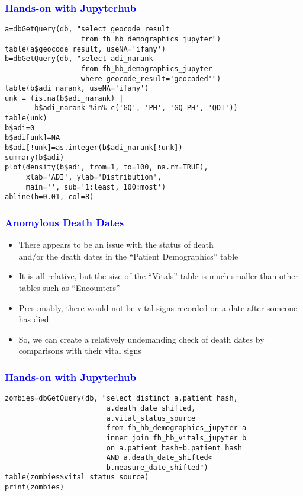 \documentclass[11pt,pdftex,dvipsnames,usenames]{beamer}
\begin{document}
\begin{frame}[fragile]\frametitle{\bf\textcolor{blue}{Hands-on with Jupyterhub}}
\begin{verbatim}
a=dbGetQuery(db, "select geocode_result 
                  from fh_hb_demographics_jupyter")
table(a$geocode_result, useNA='ifany')
b=dbGetQuery(db, "select adi_narank 
                  from fh_hb_demographics_jupyter
                  where geocode_result='geocoded'")
table(b$adi_narank, useNA='ifany')
unk = (is.na(b$adi_narank) | 
       b$adi_narank %in% c('GQ', 'PH', 'GQ-PH', 'QDI'))
table(unk)
b$adi=0
b$adi[unk]=NA
b$adi[!unk]=as.integer(b$adi_narank[!unk])
summary(b$adi)
plot(density(b$adi, from=1, to=100, na.rm=TRUE), 
     xlab='ADI', ylab='Distribution', 
     main='', sub='1:least, 100:most')
abline(h=0.01, col=8)
\end{verbatim}
\end{frame}


\begin{frame}[fragile]\frametitle{\bf\textcolor{blue}{Anomylous Death Dates}}
\begin{itemize}
\item There appears to be an issue with the status of death\\
and/or the death dates in the ``Patient Demographics'' table
\item It is all relative, but the size of the ``Vitals'' table is much smaller
than other tables such as ``Encounters''
\item Presumably, there would not be vital signs recorded on a date after someone has died
\item So, we can create a relatively undemanding check of death dates
by comparisons with their vital signs 
\end{itemize}
\end{frame}


\begin{frame}[fragile]\frametitle{\bf\textcolor{blue}{Hands-on with Jupyterhub}}
\begin{verbatim}
zombies=dbGetQuery(db, "select distinct a.patient_hash, 
                        a.death_date_shifted,
                        a.vital_status_source
                        from fh_hb_demographics_jupyter a
                        inner join fh_hb_vitals_jupyter b 
                        on a.patient_hash=b.patient_hash 
                        AND a.death_date_shifted<
                        b.measure_date_shifted")
table(zombies$vital_status_source)
print(zombies)
\end{verbatim}
\end{frame}
\end{document}
